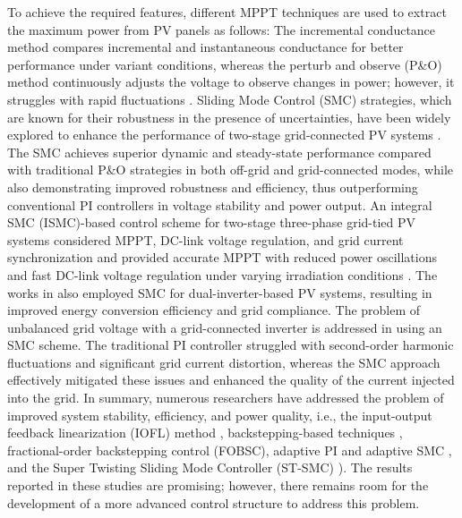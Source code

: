 \documentclass[preprint,12pt]{elsarticle}
\begin{document}
To achieve the required features, different MPPT techniques are used to extract the maximum power from PV panels as follows: The incremental conductance method compares incremental and instantaneous conductance for better performance under variant conditions, whereas the perturb and observe (P\&O) method continuously adjusts the voltage to observe changes in power; however, it struggles with rapid fluctuations \cite{soumana2022comparison}. Sliding Mode Control (SMC) strategies, which are known for their robustness in the presence of uncertainties, have been widely explored to enhance the performance of two-stage grid-connected PV systems \cite{liu2022sliding, alnami2024enhanced}. The SMC achieves superior dynamic and steady-state performance compared with traditional P\&O strategies in both off-grid and grid-connected modes, while also demonstrating improved robustness and efficiency, thus outperforming conventional PI controllers in voltage stability and power output. An integral SMC (ISMC)-based control scheme for two-stage three-phase grid-tied PV systems considered MPPT, DC-link voltage regulation, and grid current synchronization and provided accurate MPPT with reduced power oscillations and fast DC-link voltage regulation under varying irradiation conditions \cite{kihal2018robust}. The works in \cite{dash2022photovoltaic,kumar2015sliding} also employed SMC for dual-inverter-based PV systems, resulting in improved energy conversion efficiency and grid compliance. The problem of unbalanced grid voltage with a grid-connected inverter is addressed in \cite{wu2022sliding} using an SMC scheme. The traditional PI controller struggled with second-order harmonic fluctuations and significant grid current distortion, whereas the SMC approach effectively mitigated these issues and enhanced the quality of the current injected into the grid. In summary, numerous researchers have addressed the problem of improved system stability, efficiency, and power quality, i.e., the input-output feedback linearization (IOFL) method \cite{parvathy2020modelling}, backstepping-based techniques \cite{aouadi2018nonlinear,naddami2022nonlinear}, fractional-order backstepping control (FOBSC), adaptive PI and adaptive SMC \cite{zeb2021control}, and the Super Twisting Sliding Mode Controller (ST-SMC) \cite{zeb2020design,dash2024robust}). The results reported in these studies are promising; however, there remains room for the development of a more advanced control structure to address this problem.
\end{document}
